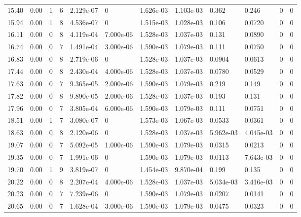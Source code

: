 \documentclass[preview]{standalone}
\begin{document}
{{{\begin{tabular}{L{1.2cm}C{1.2cm} C{0.3cm}C{0.5cm} C{1.4cm}C{1.4cm} C{1.4cm}C{1.4cm} C{1.6cm}C{1.6cm} C{1.6cm}C{1.6cm}}
  15.40  &  0.00  & 1     &  6 &  2.129e-07  & 0  &  1.626e-03&   1.103e-03& 0.362 & 0.246   &  0 & 0  \\ 
  15.94  &  0.00  & 1     &  8 &  4.536e-07  & 0  &  1.515e-03&   1.028e-03& 0.106 & 0.0720   &  0 & 0  \\ 
  16.11  &  0.00  & 0     &  8 &  4.119e-04  & 7.000e-06  &  1.528e-03&   1.037e-03& 0.131 & 0.0890   &  0 & 0  \\ 
  16.74  &  0.00  & 0     &  7 &  1.491e-04  & 3.000e-06  &  1.590e-03&   1.079e-03& 0.111 & 0.0750   &  0 & 0  \\ 
  16.83  &  0.00  & 0     &  8 &  2.719e-06  & 0  &  1.528e-03&   1.037e-03& 0.0904 & 0.0613   &  0 & 0  \\ 
  17.44  &  0.00  & 0     &  8 &  2.430e-04  & 4.000e-06  &  1.528e-03&   1.037e-03& 0.0780 & 0.0529   &  0 & 0  \\ 
  17.63  &  0.00  & 0     &  7 &  9.365e-05  & 2.000e-06  &  1.590e-03&   1.079e-03& 0.219 & 0.149   &  0 & 0  \\ 
  17.82  &  0.00  & 0     &  8 &  9.890e-05  & 2.000e-06  &  1.528e-03&   1.037e-03& 0.193 & 0.131   &  0 & 0  \\ 
  17.96  &  0.00  & 0     &  7 &  3.805e-04  & 6.000e-06  &  1.590e-03&   1.079e-03& 0.111 & 0.0751   &  0 & 0  \\ 
  18.51  &  0.00  & 1     &  7 &  3.080e-07  & 0  &  1.573e-03&   1.067e-03& 0.0533 & 0.0361   &  0 & 0  \\ 
  18.63  &  0.00  & 0     &  8 &  2.120e-06  & 0  &  1.528e-03&   1.037e-03& 5.962e-03 & 4.045e-03   &  0 & 0  \\ 
  19.07  &  0.00  & 0     &  7 &  5.092e-05  & 1.000e-06  &  1.590e-03&   1.079e-03& 0.0315 & 0.0213   &  0 & 0  \\ 
  19.35  &  0.00  & 0     &  7 &  1.991e-06  & 0  &  1.590e-03&   1.079e-03& 0.0113 & 7.643e-03   &  0 & 0  \\ 
  19.70  &  0.00  & 1     &  9 &  3.819e-07  & 0  &  1.454e-03&   9.870e-04& 0.199 & 0.135   &  0 & 0  \\ 
  20.22  &  0.00  & 0     &  8 &  2.207e-04  & 4.000e-06  &  1.528e-03&   1.037e-03& 5.034e-03 & 3.416e-03   &  0 & 0  \\ 
  20.23  &  0.00  & 0     &  7 &  7.239e-06  & 0  &  1.590e-03&   1.079e-03& 0.0207 & 0.0141   &  0 & 0  \\ 
  20.65  &  0.00  & 0     &  7 &  1.628e-04  & 3.000e-06  &  1.590e-03&   1.079e-03& 0.0475 & 0.0323   &  0 & 0  \\ 

\end{tabular}}}}
\end{document}

